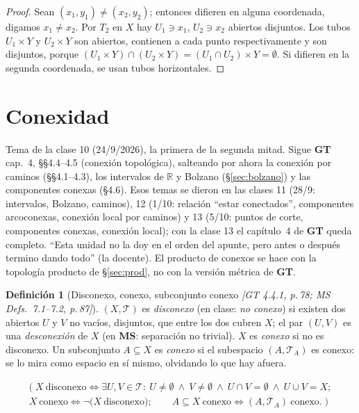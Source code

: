 \documentclass[11pt,a4paper]{article}
\newcommand{\lgc}[1]{\par\vspace{-3pt}\begin{gather*}\big(\;#1\;\big)\end{gather*}\vspace{-6pt}}
\theoremstyle{definition}
\newtheorem{definicion}{Definición}[section]
\theoremstyle{plain}
\newcommand{\fnt}[1]{{\normalfont\small\itshape\color{gray!150!black}[#1]}}
\newcommand{\R}{\mathbb{R}}
\newcommand{\tp}{\mathcal{T}}
\begin{document}
\begin{proof}
Sean $(x_1,y_1)\ne(x_2,y_2)$; entonces difieren en alguna coordenada, digamos $x_1\ne x_2$. Por $T_2$ en $X$ hay $U_1\ni x_1$, $U_2\ni x_2$ abiertos disjuntos. Los tubos $U_1\times Y$ y $U_2\times Y$ son abiertos, contienen a cada punto respectivamente y son disjuntos, porque $(U_1\times Y)\cap(U_2\times Y)=(U_1\cap U_2)\times Y=\emptyset$. Si difieren en la segunda coordenada, se usan tubos horizontales.
\end{proof}

\section{Conexidad}\label{sec:conex}

\noindent Tema de la clase 10 (24/9/2026), la primera de la segunda mitad. Sigue \textbf{GT} cap.~4, \S\S4.4--4.5 (conexión topológica), salteando por ahora la conexión por caminos (\S\S4.1--4.3), los intervalos de $\R$ y Bolzano (\S\ref{sec:bolzano}) y las componentes conexas (\S4.6). Esos temas se dieron en las clases 11 (28/9: intervalos, Bolzano, caminos), 12 (1/10: relación ``estar conectados'', componentes arcoconexas, conexión local por caminos) y 13 (5/10: puntos de corte, componentes conexas, conexión local); con la clase 13 el capítulo~4 de \textbf{GT} queda completo. ``Esta unidad no la doy en el orden del apunte, pero antes o después termino dando todo'' (la docente). El producto de conexos se hace con la topología producto de \S\ref{sec:prod}, no con la versión métrica de \textbf{GT}.

\begin{definicion}[Disconexo, conexo, subconjunto conexo \fnt{GT 4.4.1, p.\,78; MS Defs.\ 7.1--7.2, p.\,87}]
$(X,\tp)$ es \emph{disconexo} (en clase: \emph{no conexo}) si existen dos abiertos $U$ y $V$ no vacíos, disjuntos, que entre los dos cubren $X$; el par $(U,V)$ es una \emph{desconexión} de $X$ (en \textbf{MS}: separación no trivial). $X$ es \emph{conexo} si no es disconexo. Un subconjunto $A\subseteq X$ es \emph{conexo} si el subespacio $(A,\tp_A)$ es conexo: se lo mira como espacio en sí mismo, olvidando lo que hay afuera.
\lgc{X\ \text{disconexo}\iff \exists U,V\in\tp:\ U\ne\emptyset\ \wedge\ V\ne\emptyset\ \wedge\ U\cap V=\emptyset\ \wedge\ U\cup V=X;\\
X\ \text{conexo}\iff \neg\big(X\ \text{disconexo}\big);\qquad A\subseteq X\ \text{conexo}\iff (A,\tp_A)\ \text{conexo}.}
\end{definicion}
\end{document}
